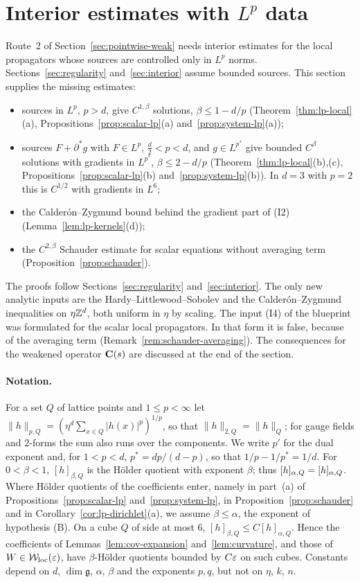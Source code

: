 \section{Interior estimates with \texorpdfstring{$L^p$}{Lp} data}\label{sec:interior-lp}

Route~2 of Section~\ref{sec:pointwise-weak} needs interior estimates for the local propagators whose sources are controlled only in $L^p$ norms. Sections~\ref{sec:regularity} and~\ref{sec:interior} assume bounded sources. This section supplies the missing estimates:
\begin{itemize}
\item[(I1)] sources in $L^p$, $p>d$, give $C^{1,\beta}$ solutions, $\beta\le1-d/p$ (Theorem~\ref{thm:lp-local}(a), Propositions~\ref{prop:scalar-lp}(a) and~\ref{prop:system-lp}(a));
\item[(I2)] sources $F+\partial^*g$ with $F\in L^p$, $\frac d2<p<d$, and $g\in L^{p^*}$ give bounded $C^\beta$ solutions with gradients in $L^{p^*}$, $\beta\le2-d/p$ (Theorem~\ref{thm:lp-local}(b),(c), Propositions~\ref{prop:scalar-lp}(b) and~\ref{prop:system-lp}(b)). In $d=3$ with $p=2$ this is $C^{1/2}$ with gradients in $L^6$;
\item[(I3)] the Calder\'on--Zygmund bound behind the gradient part of (I2) (Lemma~\ref{lem:lp-kernels}(d));
\item[(I4)] the $C^{2,\beta}$ Schauder estimate for scalar equations without averaging term (Proposition~\ref{prop:schauder}).
\end{itemize}
The proofs follow Sections~\ref{sec:regularity} and~\ref{sec:interior}. The only new analytic inputs are the Hardy--Littlewood--Sobolev and the Calder\'on--Zygmund inequalities on $\eta\mathbb Z^d$, both uniform in $\eta$ by scaling. The input (I4) of the blueprint was formulated for the scalar local propagators. In that form it is false, because of the averaging term (Remark~\ref{rem:schauder-averaging}). The consequences for the weakened operator $\mathbf C(s)$ are discussed at the end of the section.

\paragraph{Notation.} For a set $Q$ of lattice points and $1\le p<\infty$ let $\|h\|_{p,Q}=(\eta^d\sum_{x\in Q}|h(x)|^p)^{1/p}$, so that $\|h\|_{2,Q}=\|h\|_Q$; for gauge fields and $2$-forms the sum also runs over the components. We write $p'$ for the dual exponent and, for $1<p<d$, $p^*=dp/(d-p)$, so that $1/p-1/p^*=1/d$. For $0<\beta<1$, $[h]_{\beta,Q}$ is the H\"older quotient with exponent $\beta$; thus $[h]_{\alpha,Q}=[h]_{\alpha,Q}$. Where H\"older quotients of the coefficients enter, namely in part~(a) of Propositions~\ref{prop:scalar-lp} and~\ref{prop:system-lp}, in Proposition~\ref{prop:schauder} and in Corollary~\ref{cor:lp-dirichlet}(a), we assume $\beta\le\alpha$, the exponent of hypothesis (B). On a cube $Q$ of side at most $6$, $[h]_{\beta,Q}\le C[h]_{\alpha,Q}$. Hence the coefficients of Lemmas~\ref{lem:cov-expansion} and~\ref{lem:curvature}, and those of $W\in\mathcal W_{\rm loc}(\varepsilon)$, have $\beta$-H\"older quotients bounded by $C\varepsilon$ on such cubes. Constants depend on $d$, $\dim\mathfrak g$, $\alpha$, $\beta$ and the exponents $p,q$, but not on $\eta$, $k$, $n$.

